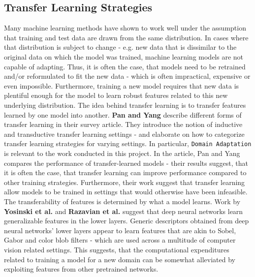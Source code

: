 \subsection{Transfer Learning Strategies}
Many machine learning methods have shown to work well under the assumption that training and test data are drawn from the same distribution. 
In cases where that distribution is subject to change - e.g. new data that is dissimilar to the original data on which the model was trained, machine learning models are not capable of adapting.
Thus, it is often the case, that models need to be retrained and/or reformulated to fit the new data - which is often impractical, expensive or even impossible. 
Furthermore, training a new model requires that new data is plentiful enough for the model to learn robust features related to this new underlying distribution. 
The idea behind transfer learning is to transfer features learned by one model into another.
\newline
\textbf{Pan and Yang}\autocite{PanYang2010} describe different forms of transfer learning in their survey article. 
They introduce the notion of inductive and transductive transfer learning settings - and elaborate on how to categorize transfer learning strategies for varying settings. 
In particular, \texttt{Domain Adaptation} is relevant to the work conducted in this project. 
In the article, Pan and Yang compares the performance of transfer-learned models - their results suggest, that it is often the case, that transfer learning can improve performance compared to other training strategies. 
Furthermore, their work suggest that transfer learning allow models to be trained in settings that would otherwise have been infeasible. 
\newline
The transferability of features is determined by what a model learns. 
Work by \textbf{Yosinski et al.}\autocite{Yosinski2014} and \textbf{Razavian et al.}\autocite{Razavian2014} suggest that deep neural networks learn generalizable features in the lower layers.
Generic descriptors obtained from deep neural networks' lower layers appear to learn features that are akin to Sobel, Gabor and color blob filters - which are used across a multitude of computer vision related settings.
This suggests, that the computational expenditures related to training a model for a new domain can be somewhat alleviated by exploiting features from other pretrained networks. 

